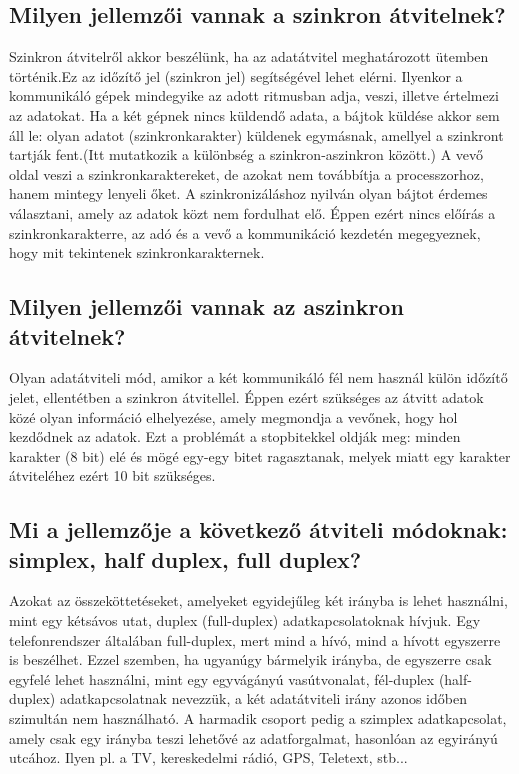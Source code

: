 \documentclass[12pt, a4paper]{article}
\begin{document}
\subsection{Milyen jellemzői vannak a szinkron átvitelnek?}
Szinkron átvitelről akkor beszélünk, ha az adatátvitel meghatározott ütemben történik.Ez az időzítő jel (szinkron jel) segítségével lehet elérni. Ilyenkor a kommunikáló gépek mindegyike az adott ritmusban adja, veszi, illetve értelmezi az adatokat. Ha a két gépnek nincs küldendő adata, a bájtok küldése akkor sem áll le: olyan adatot (szinkronkarakter) küldenek egymásnak, amellyel a szinkront tartják fent.(Itt mutatkozik a különbség a szinkron-aszinkron között.) A vevő oldal veszi a szinkronkaraktereket, de azokat nem továbbítja a processzorhoz, hanem mintegy lenyeli őket. A szinkronizáláshoz nyilván olyan bájtot érdemes választani, amely az adatok közt nem fordulhat elő. Éppen ezért nincs előírás a szinkronkarakterre, az adó és a vevő a kommunikáció kezdetén megegyeznek, hogy mit tekintenek szinkronkarakternek.
\subsection{Milyen jellemzői vannak az aszinkron átvitelnek?}
Olyan adatátviteli mód, amikor a két kommunikáló fél nem használ külön időzítő jelet, ellentétben a szinkron átvitellel. Éppen ezért szükséges az átvitt adatok közé olyan információ elhelyezése, amely megmondja a vevőnek, hogy hol kezdődnek az adatok. Ezt a problémát a stopbitekkel oldják meg: minden karakter (8 bit) elé és mögé egy-egy bitet ragasztanak, melyek miatt egy karakter átviteléhez ezért 10 bit szükséges.
\subsection{ Mi a jellemzője a következő átviteli módoknak: simplex, half duplex, full duplex?}
Azokat az összeköttetéseket, amelyeket egyidejűleg két irányba is lehet használni, mint egy kétsávos utat, duplex (full-duplex) adatkapcsolatoknak hívjuk. Egy telefonrendszer általában full-duplex, mert mind a hívó, mind a hívott egyszerre is beszélhet. Ezzel szemben, ha ugyanúgy bármelyik irányba, de egyszerre csak egyfelé lehet használni, mint egy egyvágányú vasútvonalat, fél-duplex (half-duplex) adatkapcsolatnak nevezzük, a két adatátviteli irány azonos időben szimultán nem használható. A harmadik csoport pedig a szimplex adatkapcsolat, amely csak egy irányba teszi lehetővé az adatforgalmat, hasonlóan az egyirányú utcához. Ilyen pl. a TV, kereskedelmi rádió, GPS, Teletext, stb...
\end{document}
